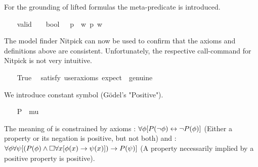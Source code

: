 \begin{isabellebody}
\begin{isamarkuptext}%
For the grounding of lifted formulas the meta-predicate  is 
 introduced.%
\end{isamarkuptext}%
\isamarkuptrue%
\ \ \isamarkupfalse%
\ valid\ {\isacharcolon}{\isacharcolon}\ {\isachardoublequoteopen}{\isasymsigma}\ {\isasymRightarrow}\ bool{\isachardoublequoteclose}\ {\isacharparenleft}{\isachardoublequoteopen}{\isacharbrackleft}{\isacharunderscore}{\isacharbrackright}{\isachardoublequoteclose}{\isacharparenright}\ \ {\isachardoublequoteopen}{\isacharbrackleft}p{\isacharbrackright}\ {\isasymequiv}\ {\isasymforall}w{\isachardot}\ p\ w{\isachardoublequoteclose}%
\begin{isamarkuptext}%
The model finder Nitpick can now be used to confirm that the axioms and 
 definitions above are consistent. Unfortunately, the respective call-command for 
 Nitpick is not very intuitive.%
\end{isamarkuptext}%
\isamarkuptrue%
\ \ \isamarkupfalse%
\ True\ \isamarkupfalse%
\ {\isacharbrackleft}satisfy{\isacharcomma}\ user{\isacharunderscore}axioms{\isacharcomma}\ expect\ {\isacharequal}\ genuine{\isacharbrackright}%
\isadelimproof
\ %
\endisadelimproof
%
\isatagproof
{}\isamarkupfalse%
%
\endisatagproof
{\isafoldproof}%
%
\isadelimproof
%
\endisadelimproof
%
\isamarkuptrue%
%
\begin{isamarkuptext}%
We introduce constant symbol  (G\"odel's "Positive").%
\end{isamarkuptext}%
\isamarkuptrue%
\ \ \isamarkupfalse%
\ P\ {\isacharcolon}{\isacharcolon}\ {\isachardoublequoteopen}{\isacharparenleft}mu\ {\isasymRightarrow}\ {\isasymsigma}{\isacharparenright}\ {\isasymRightarrow}\ {\isasymsigma}{\isachardoublequoteclose}%
\begin{isamarkuptext}%
The meaning of  is constrained by axioms 
 : $\forall \phi [P(\neg \phi) \leftrightarrow \neg P(\phi)]$ (Either a property or 
 its negation is positive, but not both) and 
 : $\forall \phi \forall \psi [(P(\phi) \wedge \Box \forall x [\phi(x) \rightarrow \psi(x)]) 
 \rightarrow P(\psi)]$ (A property necessarily implied by a positive property is positive).%
\end{isamarkuptext}%
\isamarkuptrue%
\ \ \isamarkupfalse%
\ \isanewline

\end{isabellebody}
